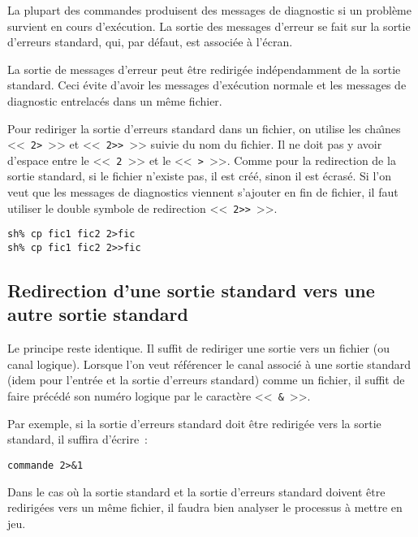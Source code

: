 La plupart des commandes {\Unix} produisent des messages de diagnostic
si un probl{\`e}me survient en cours d'ex{\'e}cution. La sortie des
messages d'erreur se fait sur la sortie d'erreurs standard, qui, par d{\'e}faut, est
associ{\'e}e {\`a} l'{\'e}cran.

La sortie de messages d'erreur peut {\^e}tre redirig{\'e}e ind{\'e}pendamment de la
sortie standard. Ceci {\'e}vite d'avoir les messages d'ex{\'e}cution normale et
les messages de diagnostic entrelac{\'e}s dans un m{\^e}me fichier.

Pour rediriger la sortie d'erreurs standard dans un fichier, on utilise
les cha{\^\i}nes <<~\verb=2>=~>> et <<~\verb=2>>=~>> suivie du nom du fichier. Il ne doit
pas y avoir d'espace entre le <<~\texttt{2}~>> et le <<~\verb=>=~>>. Comme pour la
redirection de la sortie standard, si le fichier n'existe pas, il est
cr{\'e}{\'e}, sinon il est {\'e}cras{\'e}. Si l'on veut que les messages de diagnostics
viennent s'ajouter en fin de fichier, il faut utiliser le double symbole
de redirection <<~\verb=2>>=~>>.

\begin{example}
\begin{verbatim}
sh% cp fic1 fic2 2>fic
sh% cp fic1 fic2 2>>fic
\end{verbatim}
\end{example}

\subsection{Redirection d'une sortie standard vers une autre sortie standard}

Le principe reste identique. Il suffit de rediriger une sortie vers un
fichier (ou canal logique). Lorsque l'on veut r{\'e}f{\'e}rencer le canal
associ{\'e} {\`a} une sortie standard (idem pour l'entr{\'e}e et la sortie d'erreurs
standard) comme un fichier, il suffit de faire pr{\'e}c{\'e}d{\'e} son num{\'e}ro
logique par le caract{\`e}re <<~\texttt{\&}~>>.

Par exemple, si la sortie d'erreurs standard doit {\^e}tre redirig{\'e}e vers la
sortie standard, il
suffira d'{\'e}crire~:
\begin{verbatim}
commande 2>&1
\end{verbatim}

Dans le cas o{\`u} la sortie standard et la sortie d'erreurs standard doivent {\^e}tre redirig{\'e}es
vers un m{\^e}me fichier, il faudra bien analyser le processus {\`a} mettre en jeu.

